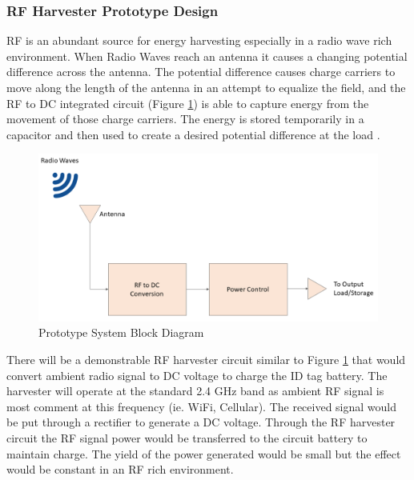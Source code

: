 \break
\subsubsection{RF Harvester Prototype Design}
RF is an abundant source for energy harvesting especially in a radio wave rich environment. When Radio Waves reach an antenna it causes a changing potential difference across the antenna. The potential difference causes charge carriers to move along the length of the antenna in an attempt to equalize the field, and the RF to \Gls{DC} integrated circuit (Figure \ref{fig:rfh}) is able to capture energy from the movement of those charge carriers. The energy is stored temporarily in a capacitor and then used to create a desired potential difference at the load \cite{R5}.
\begin{figure}[h!]
    \centering
    \includegraphics[width=\linewidth]{./images/rf_harvest.png}
    \caption{Prototype System Block Diagram}
    \label{fig:rfh}
\end{figure}

\bigskip
There will be a demonstrable RF harvester circuit similar to Figure \ref{fig:rfh} that would convert ambient radio signal to DC voltage to charge the ID tag battery. The harvester will operate at the standard 2.4 GHz band as ambient RF signal is most comment at this frequency (ie. WiFi, Cellular). The received signal would be put through a rectifier to generate a DC voltage. Through the RF harvester circuit the RF signal power would be transferred to the circuit battery to maintain charge. The yield of the power generated would be small but the effect would be constant in an RF rich environment.

\break
